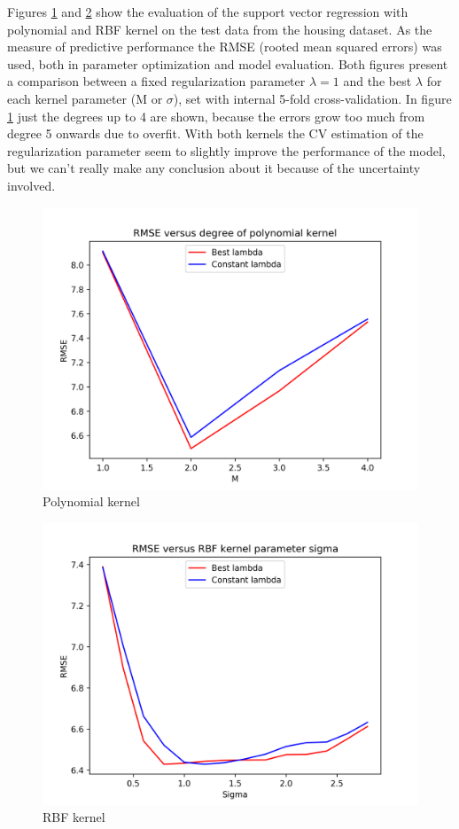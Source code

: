\documentclass[twocolumn]{article}
\begin{document}
Figures \ref{fig:house_pol} and \ref{fig:house_rbf} show the evaluation of the support vector regression with polynomial and RBF kernel on the test data from the housing dataset. As the measure of predictive performance the RMSE (rooted mean squared errors) was used, both in parameter optimization and model evaluation. Both figures present a comparison between a fixed regularization parameter $\lambda  = 1$ and the best $\lambda$ for each kernel parameter (M or $\sigma$), set with internal 5-fold cross-validation. In figure \ref{fig:house_pol} just the degrees up to 4 are shown, because the errors grow too much from degree 5 onwards due to overfit. With both kernels the CV estimation of the regularization parameter seem to slightly improve the performance of the model, but we can't really make any conclusion about it because of the uncertainty involved.

\begin{figure}[ht]
    \centering
    \includegraphics[width=.4\textwidth]{housing_pol.png}
    \caption{Polynomial kernel}
    \label{fig:house_pol}
\end{figure}

\begin{figure}[ht]
    \centering
    \includegraphics[width=.4\textwidth]{housing_rbf.png}
    \caption{RBF kernel}
    \label{fig:house_rbf}
\end{figure}
\end{document}
